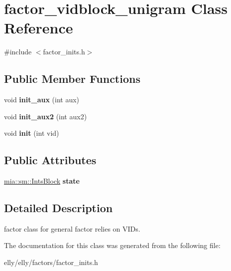 \hypertarget{classfactor__vidblock__unigram}{\section{factor\-\_\-vidblock\-\_\-unigram Class Reference}
\label{classfactor__vidblock__unigram}
}


{\ttfamily \#include $<$factor\-\_\-inits.\-h$>$}

\subsection*{Public Member Functions}
\begin{DoxyCompactItemize}
\item 
\hypertarget{classfactor__vidblock__unigram_ae3e9a7998e669a52fd00410e17e87648}{void {\bfseries init\-\_\-aux} (int aux)}\label{classfactor__vidblock__unigram_ae3e9a7998e669a52fd00410e17e87648}

\item 
\hypertarget{classfactor__vidblock__unigram_a076f9e660a6cee29835e428db0f9018e}{void {\bfseries init\-\_\-aux2} (int aux2)}\label{classfactor__vidblock__unigram_a076f9e660a6cee29835e428db0f9018e}

\item 
\hypertarget{classfactor__vidblock__unigram_ae47699589594143684c2e82a0f684fac}{void {\bfseries init} (int vid)}\label{classfactor__vidblock__unigram_ae47699589594143684c2e82a0f684fac}

\end{DoxyCompactItemize}
\subsection*{Public Attributes}
\begin{DoxyCompactItemize}
\item 
\hypertarget{classfactor__vidblock__unigram_a1cb8fe295f7b909b339928272315bea8}{\hyperlink{classmia_1_1sm_1_1_ints_block}{mia\-::sm\-::\-Ints\-Block} {\bfseries state}}\label{classfactor__vidblock__unigram_a1cb8fe295f7b909b339928272315bea8}

\end{DoxyCompactItemize}


\subsection{Detailed Description}
factor class for general factor relies on V\-I\-Ds. 

The documentation for this class was generated from the following file\-:\begin{DoxyCompactItemize}
\item 
elly/elly/factors/factor\-\_\-inits.\-h\end{DoxyCompactItemize}
